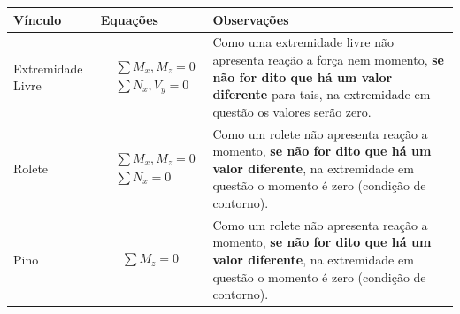\documentclass{article}
\begin{document}
\begin{table}[h]
    \tiny
    \centering
    \begin{tabularx}{\textwidth}{|X|X|X|}\hline
        \textbf{Vínculo}               & \textbf{Equações} & \textbf{Observações}                                                                                                          \\ \hline
        Extremidade Livre              &
        \begin{minipage}{.3\textwidth}
            {\begin{align*}
                     & \sum M_x, M_z = 0 \\
                     & \sum N_x, V_y = 0
                \end{align*}}
        \end{minipage} &

        \begin{minipage}{.3\textwidth}
            \vspace{5px}
            Como uma extremidade livre não apresenta reação a força nem momento, \textbf{se não for dito que há um valor diferente} para tais, na extremidade em questão os valores serão zero.
        \end{minipage} \\ \hline

        Rolete                         &
        \begin{minipage}{.3\textwidth}
            {\begin{align*}
                     & \sum M_x, M_z = 0 \\
                     & \sum N_x = 0
                \end{align*}}
        \end{minipage} &

        \begin{minipage}{.3\textwidth}
            \vspace{5px}
            Como um rolete não apresenta reação a momento, \textbf{se não for dito que há um valor diferente}, na extremidade em questão  o momento é zero (condição de contorno).
        \end{minipage}              \\ \hline

        Pino                           &
        \begin{minipage}{.3\textwidth}
            {\begin{align*}
                    \sum M_z = 0
                \end{align*}}
        \end{minipage} &

        \begin{minipage}{.3\textwidth}
            \vspace{5px}
            Como um rolete não apresenta reação a momento, \textbf{se não for dito que há um valor diferente}, na extremidade em questão o momento é zero (condição de contorno).
        \end{minipage}               \\ \hline
    \end{tabularx}
\end{table}
\end{document}

